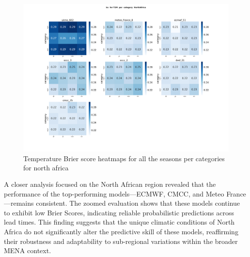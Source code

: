 \begin{figure}[H]
    \centering
    \includegraphics[width=1\linewidth]{plots/prob/bs/bs_T2M_category_NorthAfrica.png}
    \caption{Temperature Brier score heatmaps for all the seasons per categories for north africa}
\end{figure}
A closer analysis focused on the North African region revealed that the performance of the top-performing models—ECMWF, CMCC, and Meteo France—remains consistent. The zoomed evaluation shows that these models continue to exhibit low Brier Scores, indicating reliable probabilistic predictions across lead times. This finding suggests that the unique climatic conditions of North Africa do not significantly alter the predictive skill of these models, reaffirming their robustness and adaptability to sub-regional variations within the broader MENA context.


